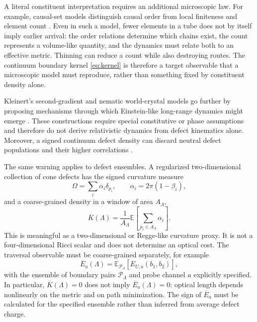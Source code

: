 \documentclass[aps,prd,twocolumn,amsmath,amssymb,nofootinbib]{revtex4-2}
\begin{document}
A literal constituent interpretation requires an additional microscopic law.
For example, causal-set models distinguish causal order from local finiteness
and element count \cite{bombelli-lee-meyer-sorkin-1987}.  Even in such a model,
fewer elements in a tube does not by itself imply earlier arrival: the order
relations determine which chains exist, the count represents a volume-like
quantity, and the dynamics must relate both to an effective metric.  Thinning
can reduce a count while also destroying routes.  The continuum boundary
kernel \eqref{eq:kernel} is therefore a target observable that a microscopic
model must reproduce, rather than something fixed by constituent density
alone.

Kleinert's second-gradient and nematic world-crystal models go further by
proposing mechanisms through which Einstein-like long-range dynamics might
emerge \cite{kleinert-1987,kleinert-2004}.  These constructions require special
constitutive or phase assumptions and therefore do not derive relativistic
dynamics from defect kinematics alone.  Moreover, a signed continuum defect
density can discard neutral defect populations and their higher correlations
\cite{kroner-2001}.

The same warning applies to defect ensembles.  A regularized two-dimensional
collection of cone defects has the signed curvature measure
\begin{equation}
 \Omega=\sum_i\alpha_i\delta_{p_i},
 \qquad \alpha_i=2\pi(1-\beta_i),
 \label{eq:defectmeasure}
\end{equation}
and a coarse-grained density in a window of area $A_{\Lambda}$,
\begin{equation}
 \overline K(\Lambda)
 =\frac{1}{A_{\Lambda}}
 \mathbb E\!\left[\sum_{p_i\in A_{\Lambda}}\alpha_i\right].
 \label{eq:coarsecurvature}
\end{equation}
This is meaningful as a two-dimensional or Regge-like curvature proxy.  It is
not a four-dimensional Ricci scalar and does not determine an optical cost.
The traversal observable must be coarse-grained separately, for example
\begin{equation}
 \overline E_a(\Lambda)
 =\mathbb E_{\mathcal P_{\Lambda}}
 \left[E_{U,a}(b_1,b_2)\right],
 \label{eq:coarsekernel}
\end{equation}
with the ensemble of boundary pairs $\mathcal P_{\Lambda}$ and probe channel
$a$ explicitly specified.  In particular,
$\overline K(\Lambda)=0$ does not imply
$\overline E_a(\Lambda)=0$: optical length depends nonlinearly on the metric
and on path minimization.  The sign of $\overline E_a$ must be calculated for
the specified ensemble rather than inferred from average defect charge.
\end{document}
